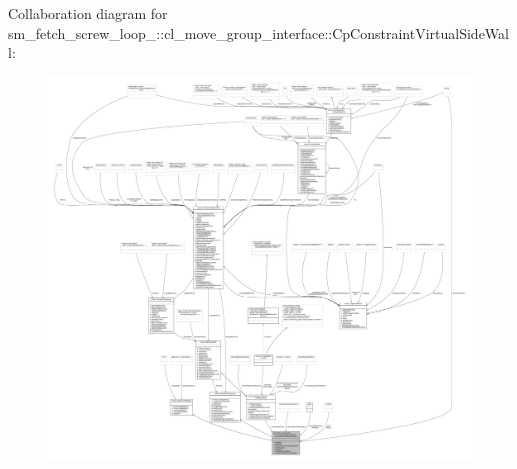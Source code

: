 Collaboration diagram for sm\+\_\+fetch\+\_\+screw\+\_\+loop\+\_\+:\+:cl\+\_\+move\+\_\+group\+\_\+interface\+:\+:Cp\+Constraint\+Virtual\+Side\+Wall\+:
\nopagebreak
\begin{figure}[H]
\begin{center}
\leavevmode
\includegraphics[width=350pt]{classsm__fetch__screw__loop__1_1_1cl__move__group__interface_1_1CpConstraintVirtualSideWall__coll__graph}
\end{center}
\end{figure}
